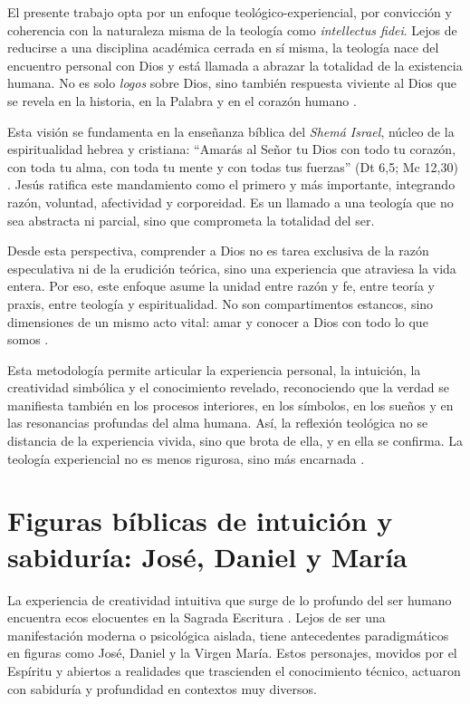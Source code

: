 \documentclass[a4paper,12pt]{article}
\begin{document}
El presente trabajo opta por un enfoque teológico-experiencial, por convicción y coherencia con la naturaleza misma de la teología como \textit{intellectus fidei}. Lejos de reducirse a una disciplina académica cerrada en sí misma, la teología nace del encuentro personal con Dios y está llamada a abrazar la totalidad de la existencia humana. No es solo \textit{logos} sobre Dios, sino también respuesta viviente al Dios que se revela en la historia, en la Palabra y en el corazón humano \cite{jung1959}.

Esta visión se fundamenta en la enseñanza bíblica del \textit{Shemá Israel}, núcleo de la espiritualidad hebrea y cristiana: ``Amarás al Señor tu Dios con todo tu corazón, con toda tu alma, con toda tu mente y con todas tus fuerzas'' (Dt 6,5; Mc 12,30) \cite{Biblia}. Jesús ratifica este mandamiento como el primero y más importante, integrando razón, voluntad, afectividad y corporeidad. Es un llamado a una teología que no sea abstracta ni parcial, sino que comprometa la totalidad del ser.

Desde esta perspectiva, comprender a Dios no es tarea exclusiva de la razón especulativa ni de la erudición teórica, sino una experiencia que atraviesa la vida entera. Por eso, este enfoque asume la unidad entre razón y fe, entre teoría y praxis, entre teología y espiritualidad. No son compartimentos estancos, sino dimensiones de un mismo acto vital: amar y conocer a Dios con todo lo que somos \cite{jung1959}.

Esta metodología permite articular la experiencia personal, la intuición, la creatividad simbólica y el conocimiento revelado, reconociendo que la verdad se manifiesta también en los procesos interiores, en los símbolos, en los sueños y en las resonancias profundas del alma humana. Así, la reflexión teológica no se distancia de la experiencia vivida, sino que brota de ella, y en ella se confirma. La teología experiencial no es menos rigurosa, sino más encarnada \cite{jung1959}.

\section*{Figuras bíblicas de intuición y sabiduría: José, Daniel y María}

La experiencia de creatividad intuitiva que surge de lo profundo del ser humano encuentra ecos elocuentes en la Sagrada Escritura \cite{Biblia}. Lejos de ser una manifestación moderna o psicológica aislada, tiene antecedentes paradigmáticos en figuras como José, Daniel y la Virgen María. Estos personajes, movidos por el Espíritu y abiertos a realidades que trascienden el conocimiento técnico, actuaron con sabiduría y profundidad en contextos muy diversos.
\end{document}
